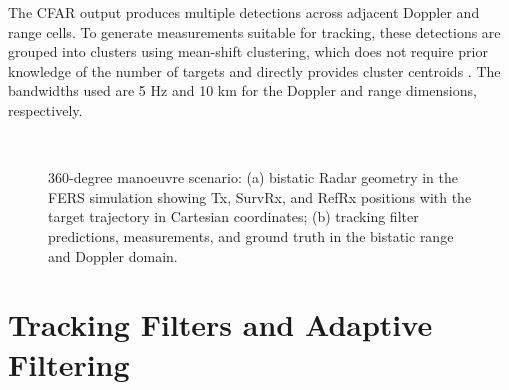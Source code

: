\documentclass[conference,10pt,a4paper]{IEEEtran}%
\begin{document}
The CFAR output produces multiple detections across adjacent Doppler and range cells. To generate measurements suitable for tracking, these detections are grouped into clusters using mean-shift clustering, which does not require prior knowledge of the number of targets and directly provides cluster centroids \cite{cheng1995mean}. The bandwidths used are 5 Hz and 10 km for the Doppler and range dimensions, respectively.

\begin{figure}[t]                                    
\centering                                            
\subfloat[]{%
  \label{fig:360_3D}%
}%
~
\subfloat[]{%
  \label{fig:360FilterOutputs}%
}%
\\[2.6mm]
\caption{360-degree manoeuvre scenario: (a) bistatic Radar geometry in the FERS simulation showing Tx, SurvRx, and RefRx positions with the target trajectory in Cartesian coordinates; (b) tracking filter predictions, measurements, and ground truth in the bistatic range and Doppler domain.}
\label{fig:360_scenario}
\end{figure}

\section{Tracking Filters and Adaptive Filtering}                                         
\end{document}
